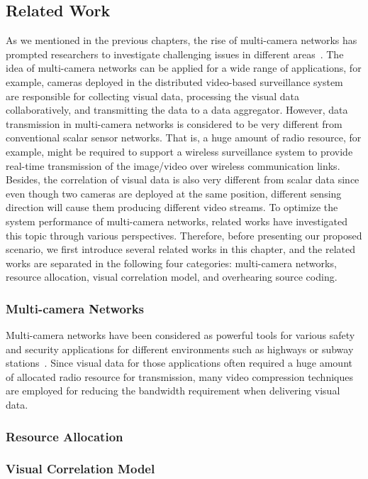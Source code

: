 \subsection{Related Work}
\label{sec::relatedWork}
As we mentioned in the previous chapters, the rise of multi-camera networks has prompted researchers to investigate challenging issues in different areas~\cite{VsnChallenges}.
The idea of multi-camera networks can be applied for a wide range of applications, for example, cameras deployed in the distributed video-based surveillance system~\cite{VideoBasedSurveillanceSystem} are responsible for collecting visual data, processing the visual data collaboratively, and transmitting the data to a data aggregator.
However, data transmission in multi-camera networks is considered to be very different from conventional scalar sensor networks.
That is, a huge amount of radio resource, for example, might be required to support a wireless surveillance system to provide real-time transmission of the image/video over wireless communication links.
Besides, the correlation of visual data is also very different from scalar data since even though two cameras are deployed at the same position, different sensing direction will cause them producing different video streams.
To optimize the system performance of multi-camera networks, related works have investigated this topic through various perspectives.
Therefore, before presenting our proposed scenario, we first introduce several related works in this chapter, and the related works are separated in the following four categories: multi-camera networks, resource allocation, visual correlation model, and overhearing source coding.
%
\subsubsection{Multi-camera Networks}
Multi-camera networks have been considered as powerful tools for various safety and security applications for different environments such as highways or subway stations~\cite{MultiCameraNetworksBook}.
Since visual data for those applications often required a huge amount of allocated radio resource for transmission, many video compression techniques are employed for reducing the bandwidth requirement when delivering visual data.
%
\subsubsection{Resource Allocation}
%
\subsubsection{Visual Correlation Model}
%

